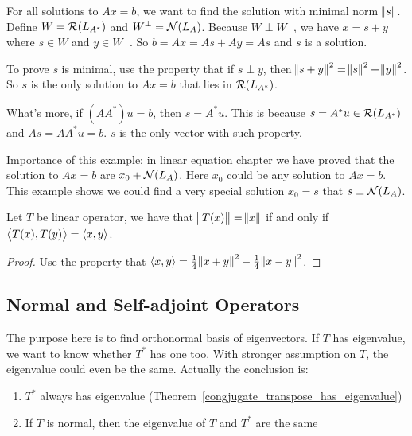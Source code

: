 \begin{example}
    For all solutions to $Ax=b$, we want to find the solution with minimal norm $\norm{s}$. Define $W = \mathcal{R}(L_{A^*})$ and $W^\perp = \mathcal{N}(L_A)$. Because $W \perp W^\perp$, we have $x = s + y$ where $s \in W$ and $y \in W^\perp$. So $b = Ax = As + Ay = As$ and $s$ is a solution.
    
    To prove $s$ is minimal, use the property that if $s \perp y$, then $\norm{s+y}^2 = \norm{s}^2 + \norm{y}^2$. So $s$ is the only solution to $Ax=b$ that lies in $\mathcal{R}(L_{A^*})$.
    
    What's more, if $(AA^*)u = b$, then $s = A^* u$. This is because $s = A^* u \in \mathcal{R}(L_{A^*})$ and $As = AA^*u = b$. $s$ is the only vector with such property.
    
    Importance of this example: in linear equation chapter we have proved that the solution to $Ax=b$ are $x_0 +  \mathcal{N}(L_A)$. Here $x_0$ could be any solution to $Ax=b$. This example shows we could find a very special solution $x_0 = s$ that $s \perp \mathcal{N}(L_A)$.
\end{example}



\begin{theorem}
    Let $T$ be linear operator, we have that $\norm{T(x)} = \norm{x}$ if and only if $\left\langle \displaystyle T(x), T(y) \right\rangle = \left\langle \displaystyle x, y \right\rangle$.
\end{theorem}
\begin{proof}
    Use the property that $\left\langle \displaystyle x, y \right\rangle = \frac{1}{4}\norm{x+y}^2 - \frac{1}{4}\norm{x-y}^2$.
\end{proof}



\subsection{Normal and Self-adjoint Operators}

The purpose here is to find orthonormal basis of eigenvectors. If $T$ has eigenvalue, we want to know whether $T^*$ has one too. With stronger assumption on $T$, the eigenvalue could even be the same. Actually the conclusion is:
\begin{enumerate}
    \item $T^*$ always has eigenvalue (Theorem~\ref{congjugate_transpose_has_eigenvalue})
    \item If $T$ is normal, then the eigenvalue of $T$ and $T^*$ are the same
\end{enumerate}


